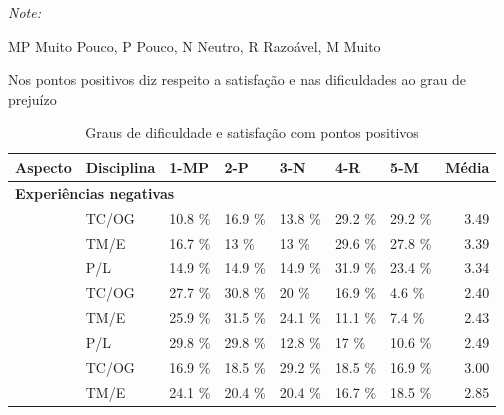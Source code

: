 \documentclass[
  12pt,
  portuguese,
]{article}
\begin{document}
\newpage

\begingroup\fontsize{10}{12}\selectfont

\begin{ThreePartTable}
\begin{TableNotes}
\item \textit{Note: } 
\item MP Muito Pouco, P Pouco, N Neutro, R Razoável, M Muito
\item Nos pontos positivos diz respeito a satisfação e nas dificuldades ao grau de prejuízo
\end{TableNotes}
\begin{longtable}[t]{l|l|l|l|l|l|l|r}
\caption{\label{tab:likertdifficulties}Graus de dificuldade e satisfação com pontos positivos}\\
\hline
Aspecto & Disciplina & 1-MP & 2-P & 3-N & 4-R & 5-M & Média\\
\hline
\multicolumn{8}{l}{\textbf{Experiências negativas}}\\
\hline
\hspace{1em} & TC/OG & 10.8 \% & 16.9 \% & 13.8 \% & 29.2 \% & 29.2 \% & 3.49\\
\cline{2-8}\nopagebreak
\hspace{1em} & TM/E & 16.7 \% & 13 \% & 13 \% & 29.6 \% & 27.8 \% & 3.39\\
\cline{2-8}\nopagebreak
\hspace{1em}\multirow{-3}{*}{\raggedright\arraybackslash Ambiente não produtivo} & P/L & 14.9 \% & 14.9 \% & 14.9 \% & 31.9 \% & 23.4 \% & 3.34\\
\cline{1-8}\pagebreak[0]
\hspace{1em} & TC/OG & 27.7 \% & 30.8 \% & 20 \% & 16.9 \% & 4.6 \% & 2.40\\
\cline{2-8}\nopagebreak
\hspace{1em} & TM/E & 25.9 \% & 31.5 \% & 24.1 \% & 11.1 \% & 7.4 \% & 2.43\\
\cline{2-8}\nopagebreak
\hspace{1em}\multirow{-3}{*}{\raggedright\arraybackslash Comunicação prejudicada} & P/L & 29.8 \% & 29.8 \% & 12.8 \% & 17 \% & 10.6 \% & 2.49\\
\cline{1-8}\pagebreak[0]
\hspace{1em} & TC/OG & 16.9 \% & 18.5 \% & 29.2 \% & 18.5 \% & 16.9 \% & 3.00\\
\cline{2-8}\nopagebreak
\hspace{1em} & TM/E & 24.1 \% & 20.4 \% & 20.4 \% & 16.7 \% & 18.5 \% & 2.85\\

\end{longtable}
\end{ThreePartTable}
\end{document}
